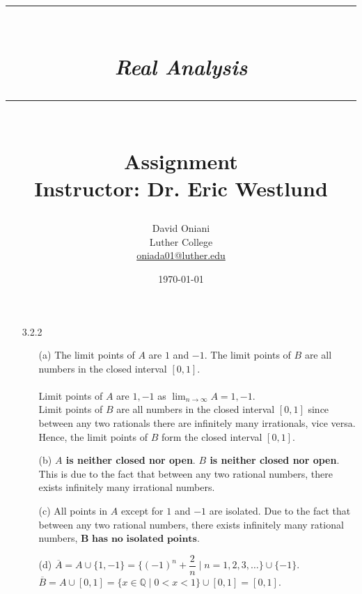 \documentclass[11pt]{article}
\author{David Oniani\\
        Luther College\\
        \href{mailto:oniada01@luther.edu}{oniada01@luther.edu}}
\title{\rule{\paperwidth - 150pt}{1pt}\textbf{\\\textit{Real Analysis}\\}\rule
{\paperwidth - 150pt}{1pt}\\\textbf{Assignment \textnumero5}\\{\normalsize
Instructor: Dr. Eric Westlund}}
\date{\today}
\newcommand{\rats}{\mathbb{Q}}
\begin{document}
\maketitle

%
%
%

\begin{itemize}
    \item[3.2.2]
        \begin{itemize}
            \item[(a)]
                The limit points of $A$ are $1$ and $-1$. The limit points of
                $B$ are all numbers in the closed interval $[0, 1]$.
                \\
                \\
                Limit points of $A$ are $1, -1$ as
                $\lim_{n \to \infty} A = 1, -1$.
                \\
                Limit points of $B$ are all numbers in the closed interval
                $[0, 1]$ since between any two rationals there are infinitely
                many irrationals, vice versa. Hence, the limit points of $B$
                form the closed interval $[0, 1]$.

            \item[(b)]
                \textbf{$A$ is neither closed nor open}. \textbf{$B$ is neither
                closed nor open}. This is due to the fact that between any two
                rational numbers, there exists infinitely many irrational
                numbers.

            \item[(c)]
                All points in $A$ except for $1$ and $-1$ are isolated. Due to
                the fact that between any two rational numbers, there exists
                infinitely many rational numbers, $\textbf{B has no isolated
                points}$.

            \item[(d)]
                $\overline{A} = A \cup \{1, -1\} = \Big\{(-1)^n + \dfrac{2}{n}
                \mid n = 1, 2, 3, \dots \Big\} \cup \{-1\}$.\\
                $\overline{B} = A \cup [0, 1] = \{x \in \rats \mid 0 < x < 1\}
                \cup [0, 1] = [0, 1]$.
        \end{itemize}


\end{itemize}
\end{document}
